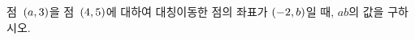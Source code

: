 점~$(a{,}\mkern3mu\mathopen{}3)$을 점~$(4{,}\mkern3mu\mathopen{}5)$에 대하여 대칭이동한 점의 좌표가 $(-2{,}\mkern3mu\mathopen{}b)$일 때, $ab$의 값을 구하시오.
